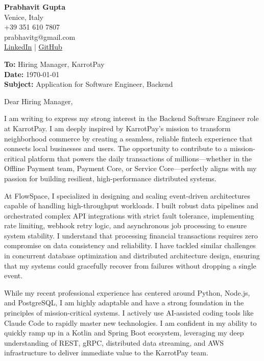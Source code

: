 \documentclass[11pt,a4paper]{article}
\begin{document}
\begin{flushright}
\textbf{Prabhavit Gupta}\\
Venice, Italy\\
+39 351 610 7807\\
prabhavitg@gmail.com\\
\href{https://www.linkedin.com/in/prabhavit/}{LinkedIn} | \href{https://github.com/prab-gupta}{GitHub}
\end{flushright}

\vspace{2em}

\textbf{To:} Hiring Manager, KarrotPay\\
\textbf{Date:} \today\\
\textbf{Subject:} Application for Software Engineer, Backend

\vspace{1em}

Dear Hiring Manager,

I am writing to express my strong interest in the Backend Software Engineer role at KarrotPay. I am deeply inspired by KarrotPay's mission to transform neighborhood commerce by creating a seamless, reliable fintech experience that connects local businesses and users. The opportunity to contribute to a mission-critical platform that powers the daily transactions of millions---whether in the Offline Payment team, Payment Core, or Service Core---perfectly aligns with my passion for building resilient, high-performance distributed systems.

At FlowSpace, I specialized in designing and scaling event-driven architectures capable of handling high-throughput workloads. I built robust data pipelines and orchestrated complex API integrations with strict fault tolerance, implementing rate limiting, webhook retry logic, and asynchronous job processing to ensure system stability. I understand that processing financial transactions requires zero compromise on data consistency and reliability. I have tackled similar challenges in concurrent database optimization and distributed architecture design, ensuring that my systems could gracefully recover from failures without dropping a single event.

While my recent professional experience has centered around Python, Node.js, and PostgreSQL, I am highly adaptable and have a strong foundation in the principles of mission-critical systems. I actively use AI-assisted coding tools like Claude Code to rapidly master new technologies. I am confident in my ability to quickly ramp up in a Kotlin and Spring Boot ecosystem, leveraging my deep understanding of REST, gRPC, distributed data streaming, and AWS infrastructure to deliver immediate value to the KarrotPay team. 
\end{document}

